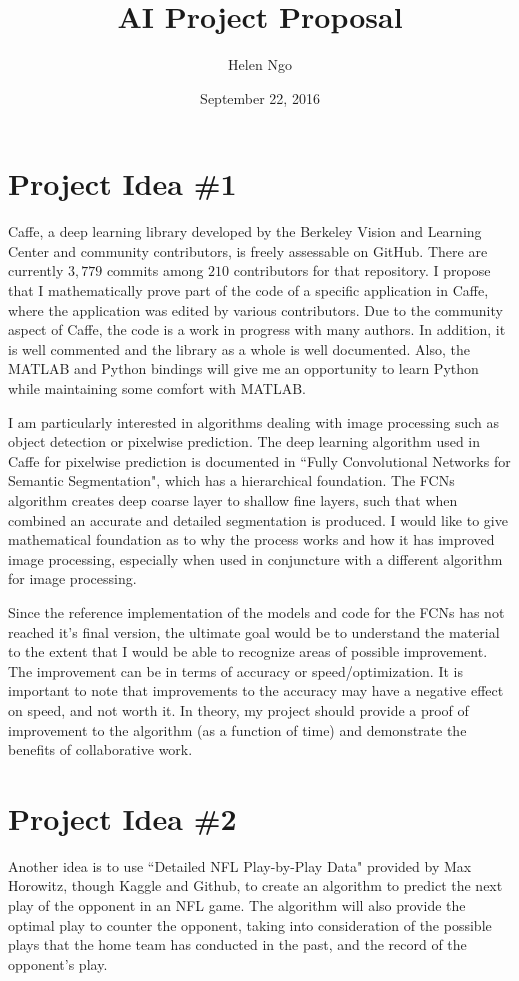 \documentclass{article}
\title{AI Project Proposal}
\author{Helen Ngo}
\date{September 22, 2016}
\begin{document}
\maketitle

\section{Project Idea \#1}
Caffe, a deep learning library developed by the Berkeley Vision and Learning Center and community contributors, is freely assessable on GitHub.\cite{caffe} There are currently $3,779$ commits among $210$ contributors for that repository. I propose that I mathematically prove part of the code of a specific application in Caffe, where the application was edited by various contributors. Due to the community aspect of Caffe, the code is a work in progress with many authors. In addition, it is well commented and the library as a whole is well documented. Also, the MATLAB and Python bindings will give me an opportunity to learn Python while maintaining some comfort with MATLAB. 

I am particularly interested in algorithms dealing with image processing such as object detection or pixelwise prediction. The deep learning algorithm used in Caffe for pixelwise prediction is documented in ``Fully Convolutional Networks for Semantic Segmentation"\cite{pixel}, which has a hierarchical foundation. The FCNs algorithm creates deep coarse layer to shallow fine layers, such that when combined an accurate and detailed segmentation is produced. I would like to give mathematical foundation as to why the process works and how it has improved image processing, especially when used in conjuncture with a different algorithm for image processing. 

Since the reference implementation of the models and code for the FCNs has not reached it's final version, the ultimate goal would be to understand the material to the extent that I would be able to recognize areas of possible improvement. The improvement can be in terms of accuracy or speed/optimization. It is important to note that improvements to the accuracy may have a negative effect on speed, and not worth it. In theory, my project should provide a proof of improvement to the algorithm (as a function of time) and demonstrate the benefits of collaborative work. 

\newpage

\section{Project Idea \#2}
Another idea is to use ``Detailed NFL Play-by-Play Data" provided by Max Horowitz, though Kaggle\cite{nfl} and Github, to create an algorithm to predict the next play of the opponent in an NFL game. The algorithm will also provide the optimal play to counter the opponent, taking into consideration of the possible plays that the home team has conducted in the past, and the record of the opponent's play. 
\end{document}
